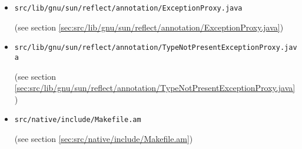 \documentclass[a4paper, 10pt, titlepage]{scrartcl} %
\begin{document}
\begin{itemize}
 \item \begin{scriptsize}\verb|src|\hspace{0.0pt}\verb|/|\hspace{0.0pt}\verb|lib|\hspace{0.0pt}\verb|/|\hspace{0.0pt}\verb|gnu|\hspace{0.0pt}\verb|/|\hspace{0.0pt}\verb|sun|\hspace{0.0pt}\verb|/|\hspace{0.0pt}\verb|reflect|\hspace{0.0pt}\verb|/|\hspace{0.0pt}\verb|annotation|\hspace{0.0pt}\verb|/|\hspace{0.0pt}\verb|ExceptionProxy|\hspace{0.0pt}\verb|.|\hspace{0.0pt}\verb|java|\end{scriptsize} (see section \ref{sec:src/lib/gnu/sun/reflect/annotation/ExceptionProxy.java})
 \item \begin{scriptsize}\verb|src|\hspace{0.0pt}\verb|/|\hspace{0.0pt}\verb|lib|\hspace{0.0pt}\verb|/|\hspace{0.0pt}\verb|gnu|\hspace{0.0pt}\verb|/|\hspace{0.0pt}\verb|sun|\hspace{0.0pt}\verb|/|\hspace{0.0pt}\verb|reflect|\hspace{0.0pt}\verb|/|\hspace{0.0pt}\verb|annotation|\hspace{0.0pt}\verb|/|\hspace{0.0pt}\verb|TypeNotPresentExceptionProxy|\hspace{0.0pt}\verb|.|\hspace{0.0pt}\verb|java|\end{scriptsize} (see section \ref{sec:src/lib/gnu/sun/reflect/annotation/TypeNotPresentExceptionProxy.java})
 \item \begin{scriptsize}\verb|src|\hspace{0.0pt}\verb|/|\hspace{0.0pt}\verb|native|\hspace{0.0pt}\verb|/|\hspace{0.0pt}\verb|include|\hspace{0.0pt}\verb|/|\hspace{0.0pt}\verb|Makefile|\hspace{0.0pt}\verb|.|\hspace{0.0pt}\verb|am|\end{scriptsize} (see section \ref{sec:src/native/include/Makefile.am})

\end{itemize}
\end{document}
